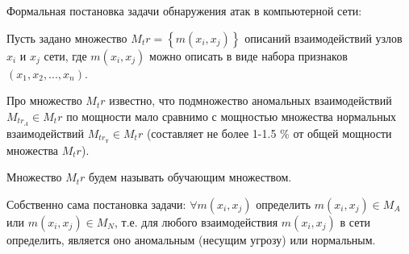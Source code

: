 \documentclass[12pt,a4paper]{article}
\begin{document}
Формальная постановка задачи обнаружения атак в компьютерной сети:

Пусть задано множество $M_tr = \left\{m(x_i, x_j)\right\}$ описаний взаимодействий узлов $x_i$ и $x_j$ сети, где $m(x_i, x_j)$ можно описать в виде набора признаков $(x_1, x_2, ..., x_n)$.

Про множество $M_tr$ известно, что подмножество аномальных взаимодействий $M_{tr_A} \in M_tr$ по мощности мало сравнимо с мощностью множества нормальных взаимодействий $M_{tr_Т} \in M_tr$ (составляет не более 1-1.5 \% от общей мощности множества $M_tr$). 

Множество $M_tr$ будем называть обучающим множеством.

Собственно сама постановка задачи: $\forall m(x_i, x_j)$ определить $m(x_i, x_j) \in M_A$ или $m(x_i, x_j) \in M_N$, т.е. для любого взаимодействия $m(x_i, x_j)$ в сети определить, является оно аномальным (несущим угрозу) или нормальным.
\end{document}
